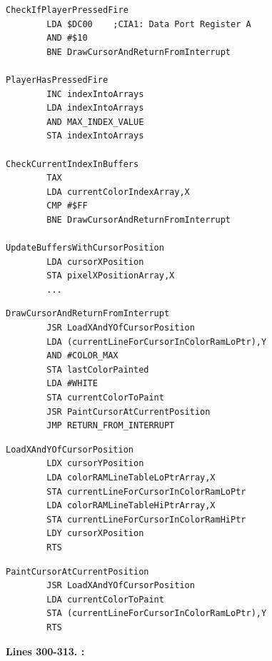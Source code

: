 \begin{lstlisting}[basicstyle=\ttfamily\scriptsize]
CheckIfPlayerPressedFire   
        LDA $DC00    ;CIA1: Data Port Register A
        AND #$10
        BNE DrawCursorAndReturnFromInterrupt

PlayerHasPressedFire
        INC indexIntoArrays
        LDA indexIntoArrays
        AND MAX_INDEX_VALUE
        STA indexIntoArrays

CheckCurrentIndexInBuffers  
        TAX 
        LDA currentColorIndexArray,X
        CMP #$FF
        BNE DrawCursorAndReturnFromInterrupt

UpdateBuffersWithCursorPosition
        LDA cursorXPosition
        STA pixelXPositionArray,X
        ...
\end{lstlisting}
\clearpage
\clearpage
\begin{lstlisting}
DrawCursorAndReturnFromInterrupt   
        JSR LoadXAndYOfCursorPosition
        LDA (currentLineForCursorInColorRamLoPtr),Y
        AND #COLOR_MAX
        STA lastColorPainted
        LDA #WHITE
        STA currentColorToPaint
        JSR PaintCursorAtCurrentPosition
        JMP RETURN_FROM_INTERRUPT

\end{lstlisting}
\begin{lstlisting}
LoadXAndYOfCursorPosition   
        LDX cursorYPosition
        LDA colorRAMLineTableLoPtrArray,X
        STA currentLineForCursorInColorRamLoPtr
        LDA colorRAMLineTableHiPtrArray,X
        STA currentLineForCursorInColorRamHiPtr
        LDY cursorXPosition
        RTS 
\end{lstlisting}
\begin{lstlisting}
PaintCursorAtCurrentPosition   
        JSR LoadXAndYOfCursorPosition
        LDA currentColorToPaint
        STA (currentLineForCursorInColorRamLoPtr),Y
        RTS 
\end{lstlisting}
\clearpage
\textbf{Lines 300-313. :} 

